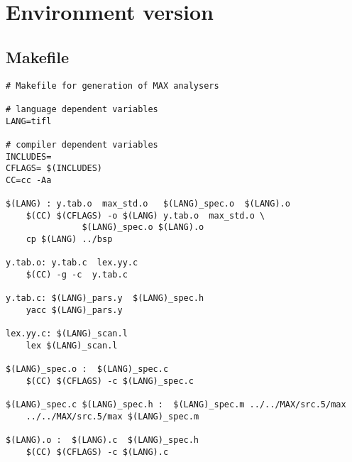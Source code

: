 \section{Environment version}
\subsection{Makefile}
\begin{verbatim}
# Makefile for generation of MAX analysers 

# language dependent variables
LANG=tifl

# compiler dependent variables
INCLUDES=
CFLAGS= $(INCLUDES)
CC=cc -Aa 

$(LANG) : y.tab.o  max_std.o   $(LANG)_spec.o  $(LANG).o 
	$(CC) $(CFLAGS) -o $(LANG) y.tab.o  max_std.o \
			   $(LANG)_spec.o $(LANG).o 
	cp $(LANG) ../bsp

y.tab.o: y.tab.c  lex.yy.c 
	$(CC) -g -c  y.tab.c

y.tab.c: $(LANG)_pars.y  $(LANG)_spec.h
	yacc $(LANG)_pars.y	

lex.yy.c: $(LANG)_scan.l 
	lex $(LANG)_scan.l 	

$(LANG)_spec.o :  $(LANG)_spec.c
	$(CC) $(CFLAGS) -c $(LANG)_spec.c

$(LANG)_spec.c $(LANG)_spec.h :  $(LANG)_spec.m ../../MAX/src.5/max
	../../MAX/src.5/max $(LANG)_spec.m

$(LANG).o :  $(LANG).c  $(LANG)_spec.h 
	$(CC) $(CFLAGS) -c $(LANG).c
\end{verbatim}

